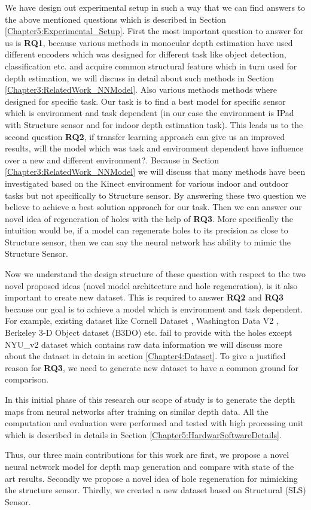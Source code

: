 We have design out experimental setup in such a way that we can find answers to the above mentioned questions which is described in Section \ref{Chapter5:Experimental_Setup}. First the most important question to answer for us is  \textbf{RQ1}, because various methods in monocular depth estimation have used different encoders which was designed for different task like object detection, classification etc. and acquire common structural feature which in turn used  for depth estimation, we will discuss in detail about such methods in Section \ref{Chapter3:RelatedWork_NNModel}. Also various methods methods where designed for specific task. Our task is to find a best model for specific sensor which is environment and task dependent (in our case the environment is IPad with Structure sensor and for indoor depth estimation task). This leads us to the second question \textbf{RQ2}, if transfer learning approach can give us an improved results, will the model which was task and environment dependent have influence over a new and different environment?. Because in Section \ref{Chapter3:RelatedWork_NNModel} we will discuss that many methods have been investigated based on the Kinect environment for various indoor and outdoor tasks but not specifically to Structure sensor.  By answering these two question we believe to achieve a best solution approach for our task. Then we can answer our novel idea of regeneration of holes with the help of \textbf{RQ3}. More specifically the intuition would be, if a model can regenerate holes to its precision as close to Structure sensor, then we can say the neural network has ability to mimic the Structure Sensor. 

Now we understand the design structure of these question with respect to the two novel proposed ideas (novel model architecture and hole regeneration), is it also important to create new dataset. This is required to answer \textbf{RQ2} and \textbf{RQ3}  because our goal is to achieve a model which is environment and task dependent. For example, existing dataset like Cornell Dataset \cite{3Dscene} , Washington Data V2 \cite{Washington}, Berkeley 3-D Object dataset (B3DO) \cite{Janoch:EECS-2012-85} etc. fail to provide with the holes except NYU\_v2 dataset which contains raw data information we will discuss more about the dataset in detain in section \ref{Chapter4:Dataset}. To give a justified reason for \textbf{RQ3}, we need to generate new dataset to have a common ground for comparison. 

In this initial phase of this research our scope of study is to generate the  depth maps from neural networks after training on similar depth data. All the computation and evaluation were performed and tested with high processing unit which is described in details in Section \ref{Chapter5:HardwarSoftwareDetails}.

Thus, our three main contributions for this work are first, we propose a novel neural network model for depth map generation and compare with state of the art results. Secondly we propose a novel idea of hole regeneration for mimicking the structure sensor. Thirdly, we created a new dataset based on Structural (SLS) Sensor.

